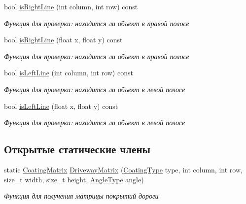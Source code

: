 \begin{DoxyCompactItemize}
bool \hyperlink{classrtm_1_1_driveway_object_ae427989fc802b24d06f6b7f83959be2a}{is\+Right\+Line} (int column, int row) const
\begin{DoxyCompactList}\small\item\em Функция для проверки\+: находится ли объект в правой полосе \end{DoxyCompactList}\item 
bool \hyperlink{classrtm_1_1_driveway_object_addaa5faebb5469e8074a46f6c3584e56}{is\+Right\+Line} (float x, float y) const
\begin{DoxyCompactList}\small\item\em Функция для проверки\+: находится ли объект в правой полосе \end{DoxyCompactList}\item 
bool \hyperlink{classrtm_1_1_driveway_object_aea7d711c9cf1ba995bc08d805373cc52}{is\+Left\+Line} (int column, int row) const
\begin{DoxyCompactList}\small\item\em Функция для проверки\+: находится ли объект в левой полосе \end{DoxyCompactList}\item 
bool \hyperlink{classrtm_1_1_driveway_object_afa48600b7d87a38e6c690e3b1058d177}{is\+Left\+Line} (float x, float y) const
\begin{DoxyCompactList}\small\item\em Функция для проверки\+: находится ли объект в левой полосе \end{DoxyCompactList}\end{DoxyCompactItemize}
\subsection*{Открытые статические члены}
\begin{DoxyCompactItemize}
\item 
static \hyperlink{namespacertm_ae3bb29510cfde424975be31866d2486e}{Coating\+Matrix} \hyperlink{classrtm_1_1_driveway_object_ab89dd0516cf883cb0c3332ae0bbc1726}{Driveway\+Matrix} (\hyperlink{namespacertm_aecd3929e64cd461eb3555b611f6fad95}{Coating\+Type} type, int column, int row, size\+\_\+t width, size\+\_\+t height, \hyperlink{namespacertm_a69dc82b16a0148c10962caa83d930f89}{Angle\+Type} angle)
\begin{DoxyCompactList}\small\item\em Функция для получения матрицы покрытий дороги \end{DoxyCompactList}\end{DoxyCompactItemize}
